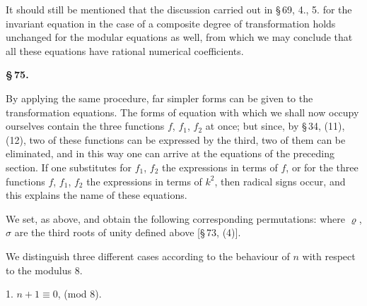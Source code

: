 It should still be mentioned that the discussion carried out in §\,69, 4., 5. for the invariant equation in the case of a composite degree of transformation holds unchanged for the  modular equations as well, from which we may conclude that all these equations have rational numerical coefficients.

\begin{center}
\textbf{§\,75.\quad {}}
\end{center}

By applying the same procedure, far simpler forms can be given to the transformation equations. The forms of equation with which we shall now occupy ourselves contain the three functions $f$, $f_1$, $f_2$ at once; but since, by §\,34, (11), (12), two of these functions can be expressed by the third, two of them can be eliminated, and in this way one can arrive at the equations of the preceding section. If one substitutes for $f_1$, $f_2$ the expressions in terms of $f$, or for the three functions $f$, $f_1$, $f_2$ the expressions in terms of $k^2$, then radical signs occur, and this explains the name of these equations.

We set, as above,
and obtain the following corresponding permutations:
where $\varrho$, $\sigma$ are the third roots of unity defined above [§\,73, (4)].

We distinguish three different cases according to the behaviour of $n$ with respect to the modulus 8.

1. $n+1\equiv 0$, (mod 8).
